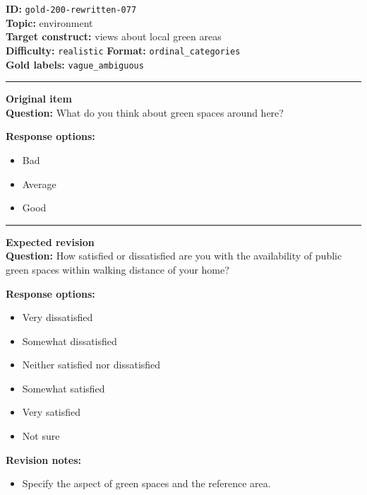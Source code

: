 \documentclass[10pt,a4paper]{article}
\newcommand{\sectionline}{\vspace{0.15em}\hrule\vspace{0.35em}}
\begin{document}
\begin{tcolorbox}[colframe=FlawRed,colback=white,colbacktitle=FlawRed!9,coltitle=black,title={Item 077\hfill Flawed item}]
\textbf{ID:} \texttt{gold-200-rewritten-077}\\
\textbf{Topic:} environment\\
\textbf{Target construct:} views about local green areas\\
\textbf{Difficulty:} \texttt{realistic} \quad \textbf{Format:} \texttt{ordinal\_categories}\\
\textbf{Gold labels:} \texttt{vague\_ambiguous}\\
\sectionline
\textbf{Original item}\\
\textbf{Question:} What do you think about green spaces around here?
\par\textbf{Response options:}
\begin{itemize}
\item Bad
\item Average
\item Good
\end{itemize}
\sectionline
\textbf{Expected revision}\\
\textbf{Question:} How satisfied or dissatisfied are you with the availability of public green spaces within walking distance of your home?
\par\textbf{Response options:}
\begin{itemize}
\item Very dissatisfied
\item Somewhat dissatisfied
\item Neither satisfied nor dissatisfied
\item Somewhat satisfied
\item Very satisfied
\item Not sure
\end{itemize}
\par\textbf{Revision notes:}
\begin{itemize}
\item Specify the aspect of green spaces and the reference area.
\end{itemize}
\end{tcolorbox}
\end{document}
